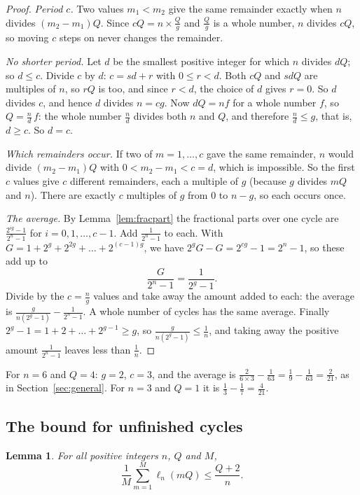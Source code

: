 \documentclass[10pt]{article}
\theoremstyle{plain}
\newtheorem{lemma}[theorem]{Lemma}
\theoremstyle{definition}
\theoremstyle{remark}
\newcommand{\lft}{\ell}
\begin{document}
\begin{proof}
\emph{Period $c$.} Two values $m_1<m_2$ give the same remainder exactly when
$n$ divides $(m_2-m_1)Q$. Since $cQ=n\times\tfrac Qg$ and $\tfrac Qg$ is a
whole number, $n$ divides $cQ$, so moving $c$ steps on never changes the
remainder.

\emph{No shorter period.} Let $d$ be the smallest positive integer for which
$n$ divides $dQ$; so $d\le c$. Divide $c$ by $d$: $c=sd+r$ with $0\le r<d$.
Both $cQ$ and $sdQ$ are multiples of $n$, so $rQ$ is too, and since $r<d$, the
choice of $d$ gives $r=0$. So $d$ divides $c$, and hence $d$ divides $n=cg$.
Now $dQ=nf$ for a whole number $f$, so $Q=\tfrac nd\,f$: the whole number
$\tfrac nd$ divides both $n$ and $Q$, and therefore $\tfrac nd\le g$, that is,
$d\ge c$. So $d=c$.

\emph{Which remainders occur.} If two of $m=1,\dots,c$ gave the same
remainder, $n$ would divide $(m_2-m_1)Q$ with $0<m_2-m_1<c=d$, which is
impossible. So the first $c$ values give $c$ different remainders, each a
multiple of $g$ (because $g$ divides $mQ$ and $n$). There are exactly $c$
multiples of $g$ from $0$ to $n-g$, so each occurs once.

\emph{The average.} By Lemma~\ref{lem:fracpart} the fractional parts over one cycle
are $\tfrac{2^{ig}-1}{2^n-1}$ for $i=0,1,\dots,c-1$. Add $\tfrac1{2^n-1}$ to
each. With $G=1+2^g+2^{2g}+\dots+2^{(c-1)g}$, we have
$2^gG-G=2^{cg}-1=2^n-1$, so these add up to
\[
 \frac G{2^n-1}=\frac1{2^g-1}.
\]
Divide by the $c=\tfrac ng$ values and take away the amount added to each: the
average is $\tfrac g{n(2^g-1)}-\tfrac1{2^n-1}$. A whole number of cycles has
the same average. Finally $2^g-1=1+2+\dots+2^{g-1}\ge g$, so
$\tfrac g{n(2^g-1)}\le\tfrac1n$, and taking away the positive amount
$\tfrac1{2^n-1}$ leaves less than $\tfrac1n$.
\end{proof}

For $n=6$ and $Q=4$: $g=2$, $c=3$, and the average is
$\tfrac2{6\times3}-\tfrac1{63}=\tfrac19-\tfrac1{63}=\tfrac2{21}$, as in
Section~\ref{sec:general}. For $n=3$ and $Q=1$ it is
$\tfrac13-\tfrac17=\tfrac4{21}$.

\subsection{The bound for unfinished cycles}\label{app:crude}

\begin{lemma}\label{lem:crude}
For all positive integers $n$, $Q$ and $M$,
\[
 \frac1M\sum_{m=1}^{M}\lft_n(mQ)\le\frac{Q+2}{n} .
\]
\end{lemma}
\end{document}
